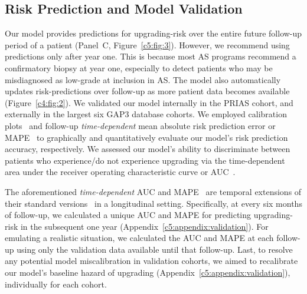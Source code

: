 \subsection{Risk Prediction and Model Validation}
Our model provides predictions for upgrading-risk over the entire future follow-up period of a patient (Panel~C, Figure~\ref{c5:fig:3}). However, we recommend using predictions only after year one. This is because most AS programs recommend a confirmatory biopsy at year one, especially to detect patients who may be misdiagnosed as low-grade at inclusion in AS. The model also automatically updates risk-predictions over follow-up as more patient data becomes available (Figure~\ref{c4:fig:2}). We validated our model internally in the PRIAS cohort, and externally in the largest six GAP3 database cohorts. We employed calibration plots~\citep{royston2013external,steyerberg2010assessing} and follow-up \textit{time-dependent} mean absolute risk prediction error or MAPE~\citep{rizopoulos2017dynamic} to graphically and quantitatively evaluate our model's risk prediction accuracy, respectively. We assessed our model's ability to discriminate between patients who experience/do not experience upgrading via the time-dependent area under the receiver operating characteristic curve or AUC~\citep{rizopoulos2017dynamic}. 

The aforementioned \textit{time-dependent} AUC and MAPE~\citep{rizopoulos2017dynamic} are temporal extensions of their standard versions~\citep{steyerberg2010assessing} in a longitudinal setting. Specifically, at every six months of follow-up, we calculated a unique AUC and MAPE for predicting upgrading-risk in the subsequent one year (Appendix~\ref{c5:appendix:validation}). For emulating a realistic situation, we calculated the AUC and MAPE at each follow-up using only the validation data available until that follow-up. Last, to resolve any potential model miscalibration in validation cohorts, we aimed to recalibrate our model's baseline hazard of upgrading (Appendix~\ref{c5:appendix:validation}), individually for each cohort.